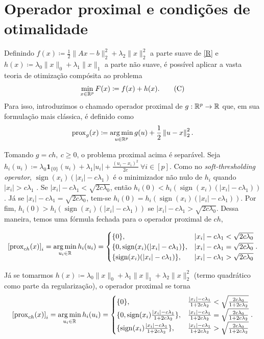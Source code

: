 \section{Operador proximal e condições de otimalidade}
Definindo $f(x)\coloneqq \frac{1}{2} \|Ax-b\|_2^2 + \lambda_2 \|x\|_2^2$ a parte suave de \eqref{R} e $h(x)\coloneqq \lambda_0 \|x\|_0 + \lambda_1 \|x\|_1$ a parte não suave, é possível aplicar a vasta teoria de otimização compósita ao problema
\[\min_{x\in\mathbb{R}^p}F(x)\coloneqq f(x)+h(x).\label{C}\tag{C}\]
Para isso, introduzimos o chamado operador proximal \cite{moreau1962} de $g:\mathbb{R}^p\to\mathbb{R}$ que, em sua formulação mais clássica, é definido como
\begin{equation}
    \label{prox}
        \operatorname{prox}_{g}(x)\coloneqq\operatorname*{arg\,min}_{u\in\mathbb{R}^p}g(u)+ \frac{1}{2}\left\| u-x \right\|_2^2 . 
\end{equation}

Tomando $g=ch,\ c\geq 0$, o problema proximal acima é separável. Seja $h_i(u_i)\coloneqq \lambda_0\mathbf{1}_{\{0\}}(u_i)+\lambda_1|u_i|+\frac{(u_i-x_i)^2}{2c}\ \forall i\in [p]$. Como no \textit{soft-thresholding operator}, $\operatorname{sign}(x_i)(|x_i|-c\lambda_1)$ é o minimizador não nulo de $h_i$ quando $|x_i|>c\lambda_1$ \cite{statsparse}. Se $|x_i|-c\lambda_1<\sqrt{2c\lambda_0}$, então $h_i(0)<h_i(\operatorname{sign}(x_i)(|x_i|-c\lambda_1))$. Já se $|x_i|-c\lambda_1=\sqrt{2c\lambda_0}$, tem-se $h_i(0)=h_i(\operatorname{sign}(x_i)(|x_i|-c\lambda_1))$. Por fim, $h_i(0)>h_i(\operatorname{sign}(x_i)(|x_i|-c\lambda_1))$ se $|x_i|-c\lambda_1>\sqrt{2c\lambda_0}$. Dessa maneira, temos uma fórmula fechada para o operador proximal de $ch$,

\[\left[\operatorname{prox}_{ch}(x)\right]_i=\operatorname*{arg\,min}_{u_i\in\mathbb{R}}h_i(u_i)=\begin{cases}
        \{0\},& |x_i|-c\lambda_1<\sqrt{2c\lambda_0}\\
        \{0,\operatorname{sign}(x_i)(|x_i|-c\lambda_1)\},& |x_i|-c\lambda_1=\sqrt{2c\lambda_0}\\
        \{\operatorname{sign}(x_i)(|x_i|-c\lambda_1)\},& |x_i|-c\lambda_1>\sqrt{2c\lambda_0}\end{cases} .\]

Já se tomarmos $h(x)\coloneqq \lambda_0 \|x\|_0 + \lambda_1 \|x\|_1+\lambda_2 \|x\|_2^2$ (termo quadrático como parte da regularização), o operador proximal se torna
\begin{equation}\label{eq:proxl0l1l2}
\left[\operatorname{prox}_{ch}(x)\right]_i=\operatorname*{arg\,min}_{u_i\in\mathbb{R}}h_i(u_i)=\begin{cases}
        \{0\},& \frac{|x_i|-c\lambda_1}{1+2c\lambda_2}<\sqrt{\frac{2c\lambda_0}{1+2c\lambda_2}}\\
        \{0,\operatorname{sign}(x_i)\frac{|x_i|-c\lambda_1}{1+2c\lambda_2}\},& \frac{|x_i|-c\lambda_1}{1+2c\lambda_2}=\sqrt{\frac{2c\lambda_0}{1+2c\lambda_2}}\\
        \{\operatorname{sign}(x_i)\frac{|x_i|-c\lambda_1}{1+2c\lambda_2}\},& \frac{|x_i|-c\lambda_1}{1+2c\lambda_2}>\sqrt{\frac{2c\lambda_0}{1+2c\lambda_2}}\end{cases} .
\end{equation}

